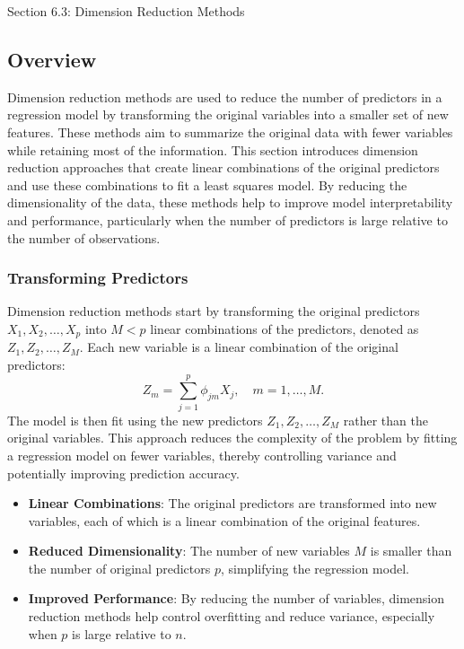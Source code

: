 \begin{notes}{Section 6.3: Dimension Reduction Methods}
    \subsection*{Overview}

    Dimension reduction methods are used to reduce the number of predictors in a regression model by transforming the original variables into a smaller set of new features. These methods aim to summarize 
    the original data with fewer variables while retaining most of the information. This section introduces dimension reduction approaches that create linear combinations of the original predictors and use these 
    combinations to fit a least squares model. By reducing the dimensionality of the data, these methods help to improve model interpretability and performance, particularly when the number of predictors is 
    large relative to the number of observations.
    
    \subsubsection*{Transforming Predictors}
    
    Dimension reduction methods start by transforming the original predictors \(X_1, X_2, \dots, X_p\) into \(M < p\) linear combinations of the predictors, denoted as \(Z_1, Z_2, \dots, Z_M\). Each new variable 
    is a linear combination of the original predictors:
    \[
    Z_m = \sum_{j=1}^{p} \phi_{jm} X_j, \quad m = 1, \dots, M.
    \]
    The model is then fit using the new predictors \(Z_1, Z_2, \dots, Z_M\) rather than the original variables. This approach reduces the complexity of the problem by fitting a regression model on fewer variables, 
    thereby controlling variance and potentially improving prediction accuracy.
    
    \begin{highlight}
        \begin{itemize}
            \item \textbf{Linear Combinations}: The original predictors are transformed into new variables, each of which is a linear combination of the original features.
            \item \textbf{Reduced Dimensionality}: The number of new variables \(M\) is smaller than the number of original predictors \(p\), simplifying the regression model.
            \item \textbf{Improved Performance}: By reducing the number of variables, dimension reduction methods help control overfitting and reduce variance, especially when \(p\) is large relative to \(n\).
        \end{itemize}
    \end{highlight}
    

\end{notes}
